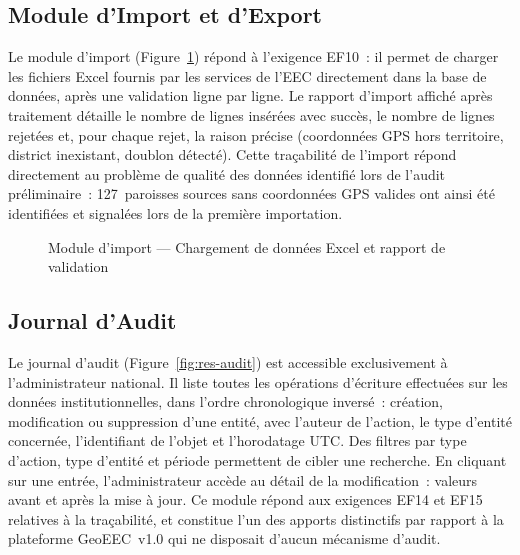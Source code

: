 \subsection{Module d'Import et d'Export}
\label{ssec:res-import}

Le module d'import (Figure~\ref{fig:res-import}) répond à l'exigence EF10~:
il permet de charger les fichiers Excel fournis par les services de l'EEC
directement dans la base de données, après une validation ligne par ligne.
Le rapport d'import affiché après traitement détaille le nombre de lignes
insérées avec succès, le nombre de lignes rejetées et, pour chaque
rejet, la raison précise (coordonnées GPS hors territoire, district
inexistant, doublon détecté). Cette traçabilité de l'import répond
directement au problème de qualité des données identifié lors de l'audit
préliminaire~: 127~paroisses sources sans coordonnées GPS valides ont ainsi
été identifiées et signalées lors de la première importation.

\begin{figure}[H]
  \centering
  \caption{Module d'import --- Chargement de données Excel et rapport de validation}
  \label{fig:res-import}
\end{figure}

\subsection{Journal d'Audit}
\label{ssec:res-audit}

Le journal d'audit (Figure~\ref{fig:res-audit}) est accessible
exclusivement à l'administrateur national. Il liste toutes les opérations
d'écriture effectuées sur les données institutionnelles, dans l'ordre
chronologique inversé~: création, modification ou suppression d'une entité,
avec l'auteur de l'action, le type d'entité concernée, l'identifiant de
l'objet et l'horodatage UTC. Des filtres par type d'action, type d'entité
et période permettent de cibler une recherche. En cliquant sur une entrée,
l'administrateur accède au détail de la modification~: valeurs avant et
après la mise à jour. Ce module répond aux exigences EF14 et EF15 relatives
à la traçabilité, et constitue l'un des apports distinctifs par rapport
à la plateforme GeoEEC~v1.0 qui ne disposait d'aucun mécanisme d'audit.

